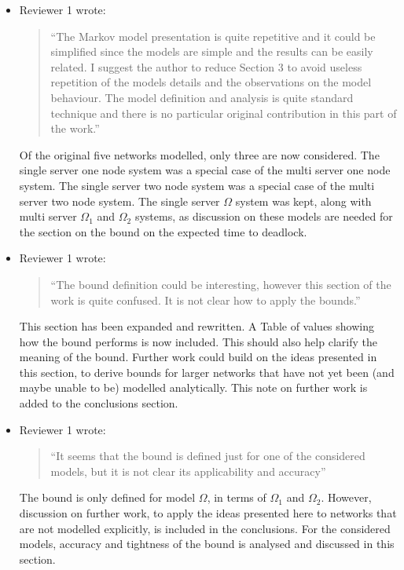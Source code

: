 \documentclass{article}
\begin{document}
\begin{itemize}

\item Reviewer 1 wrote:
\begin{quote}
``The Markov model presentation is quite repetitive and it could be simplified
since the models are simple and the results can be easily related.
I suggest the author to reduce Section 3 to avoid useless repetition of the
models details and the observations on the model behaviour.
The model definition and analysis is quite standard technique and there is no
particular original contribution in this part of the work.''
\end{quote}
Of the original five networks modelled, only three are now considered.
The single server one node system was a special case of the multi server one
node system.
The single server two node system was a special case of the multi server two
node system.
The single server $\Omega$ system was kept, along with multi server $\Omega_1$
and $\Omega_2$ systems, as discussion on these models are needed for the
section on the bound on the expected time to deadlock.


\item Reviewer 1 wrote:
\begin{quote}
``The bound definition could be interesting, however this section of the work
is quite confused.
It is not clear how to apply the bounds.''
\end{quote}
This section has been expanded and rewritten.
A Table of values showing how the bound performs is now included.
This should also help clarify the meaning of the bound.
Further work could build on the ideas presented in this section, to derive
bounds for larger networks that have not yet been (and maybe unable to be)
modelled analytically.
This note on further work is added to the conclusions section.


\item Reviewer 1 wrote:
\begin{quote}
``It seems that the bound is defined just for one of the considered models,
but it is not clear its applicability and accuracy''
\end{quote}
The bound is only defined for model $\Omega$, in terms of $\Omega_1$ and
$\Omega_2$.
However, discussion on further work, to apply the ideas presented here to
networks that are not modelled explicitly, is included in the conclusions.
For the considered models, accuracy and tightness of the bound is analysed and
discussed in this section.


\end{itemize}
\end{document}
